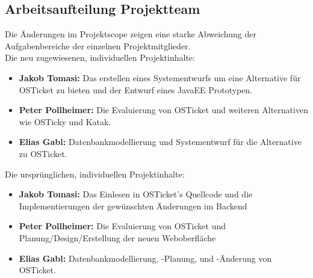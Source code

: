 	\subsection{Arbeitsaufteilung Projektteam}
	Die Änderungen im Projektscope zeigen eine starke Abweichung der Aufgabenbereiche der einzelnen Projektmitglieder.
	\\
	Die neu zugewiesenen, individuellen Projektinhalte: 
	\begin{itemize}
		\item \textbf{Jakob Tomasi:} Das erstellen eines Systementwurfs um eine Alternative für OSTicket zu bieten und der Entwurf eines JavaEE Prototypen.
		\item \textbf{Peter Pollheimer:} Die Evaluierung von OSTicket und weiteren Alternativen wie OSTicky und Katak. 
		\item \textbf{Elias Gabl:} Datenbankmodellierung und Systementwurf für die Alternative zu OSTicket.
	\end{itemize}
	\vspace{.6cm}
	Die ursprünglichen, individuellen Projektinhalte:
	\\
	\begin{itemize}
		\item \textbf{Jakob Tomasi:} Das Einlesen in OSTicket's Quellcode und die Implementierungen der gewünschten Änderungen im Backend
		\item \textbf{Peter Pollheimer:} Die Evaluierung von OSTicket und Planung/Design/Erstellung der neuen Weboberfläche
		\item \textbf{Elias Gabl:} Datenbankmodellierung, -Planung, und -Änderung  von OSTicket.
	\end{itemize}
